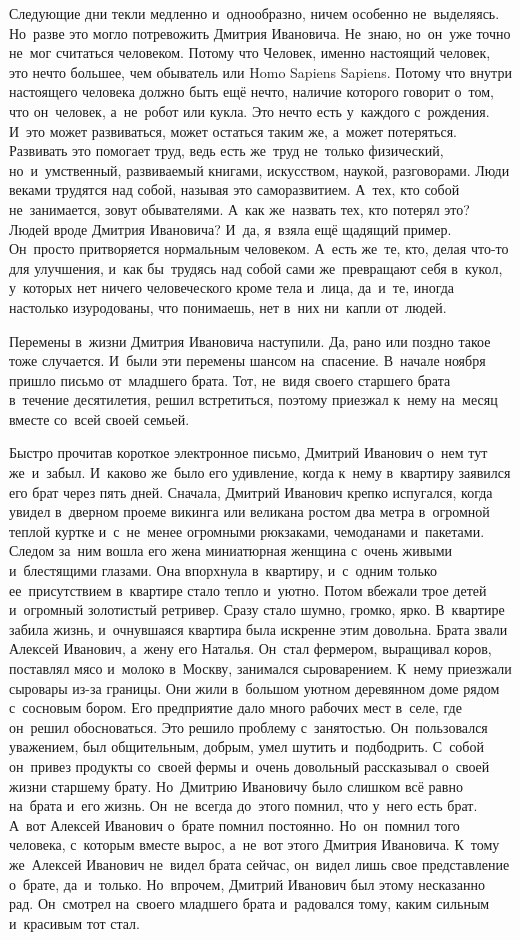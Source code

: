 Следующие дни текли медленно и~однообразно, ничем особенно не~выделяясь.
Но~разве это могло потревожить Дмитрия Ивановича.
Не~знаю, но~он~уже точно не~мог считаться человеком.
Потому что Человек, именно настоящий человек, это нечто большее, чем обыватель или Homo Sapiens Sapiens.
Потому что внутри настоящего человека должно быть ещё нечто, наличие которого говорит о~том, что он~человек, а~не~робот или кукла.
Это нечто есть у~каждого с~рождения.
И~это может развиваться, может остаться таким же, а~может потеряться.
Развивать это помогает труд, ведь есть же~труд не~только физический, но~и~умственный, развиваемый книгами, искусством, наукой, разговорами.
Люди веками трудятся над собой, называя это саморазвитием.
А~тех, кто собой не~занимается, зовут обывателями.
А~как же~назвать тех, кто потерял это? Людей вроде Дмитрия Ивановича? И~да, я~взяла ещё щадящий пример.
Он~просто притворяется нормальным человеком.
А~есть же~те, кто, делая что-то для улучшения, и~как бы~трудясь над собой сами же~превращают себя в~кукол, у~которых нет ничего человеческого кроме тела и~лица, да~и~те, иногда настолько изуродованы, что понимаешь, нет в~них ни~капли от~людей.
 
Перемены в~жизни Дмитрия Ивановича наступили.
Да, рано или поздно такое тоже случается.
И~были эти перемены шансом на~спасение.
В~начале ноября пришло письмо от~младшего брата.
Тот, не~видя своего старшего брата в~течение десятилетия, решил встретиться, поэтому приезжал к~нему на~месяц вместе со~всей своей семьей.

Быстро прочитав короткое электронное письмо, Дмитрий Иванович о~нем тут же~и~забыл.
И~каково же~было его удивление, когда к~нему в~квартиру заявился его брат через пять дней.
Сначала, Дмитрий Иванович крепко испугался, когда увидел в~дверном проеме викинга или великана ростом два метра в~огромной теплой куртке и~с~не~менее огромными рюкзаками, чемоданами и~пакетами.
Следом за~ним вошла его жена миниатюрная женщина с~очень живыми и~блестящими глазами.
Она впорхнула в~квартиру, и~с~одним только ее~присутствием в~квартире стало тепло и~уютно.
Потом вбежали трое детей и~огромный золотистый ретривер.
Сразу стало шумно, громко, ярко.
В~квартире забила жизнь, и~очнувшаяся квартира была искренне этим довольна.
Брата звали Алексей Иванович, а~жену его Наталья.
Он~стал фермером, выращивал коров, поставлял мясо и~молоко в~Москву, занимался сыроварением.
К~нему приезжали сыровары из-за границы.
Они жили в~большом уютном деревянном доме рядом с~сосновым бором.
Его предприятие дало много рабочих мест в~селе, где он~решил обосноваться.
Это решило проблему с~занятостью.
Он~пользовался уважением, был общительным, добрым, умел шутить и~подбодрить.
С~собой он~привез продукты со~своей фермы и~очень довольный рассказывал о~своей жизни старшему брату.
Но~Дмитрию Ивановичу было слишком всё равно на~брата и~его жизнь.
Он~не~всегда до~этого помнил, что у~него есть брат.
А~вот Алексей Иванович о~брате помнил постоянно.
Но~он~помнил того человека, с~которым вместе вырос, а~не~вот этого Дмитрия Ивановича.
К~тому же~Алексей Иванович не~видел брата сейчас, он~видел лишь свое представление о~брате, да~и~только.
Но~впрочем, Дмитрий Иванович был этому несказанно рад.
Он~смотрел на~своего младшего брата и~радовался тому, каким сильным и~красивым тот стал.

